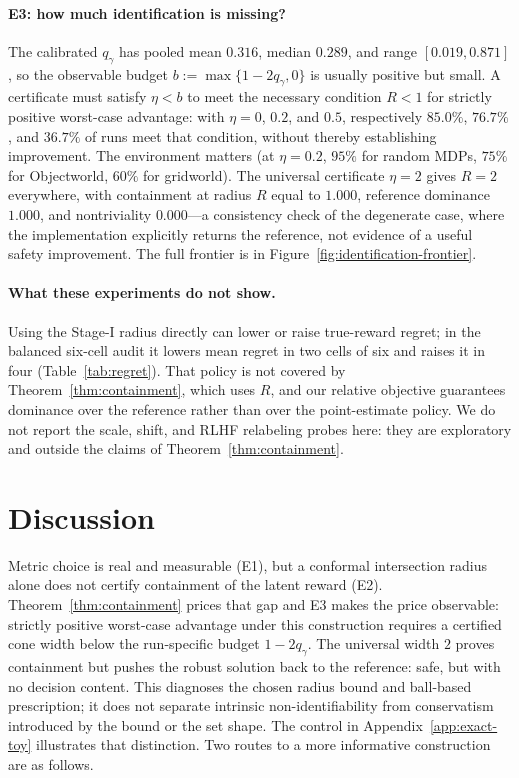 \documentclass{article}
\begin{document}
\paragraph{E3: how much identification is missing?} The calibrated $q_\gamma$
has pooled mean $0.316$, median $0.289$, and range $[0.019,0.871]$, so the
observable budget $b:=\max\{1-2q_\gamma,0\}$ is usually positive but small. A
certificate must satisfy $\eta<b$ to meet the necessary condition $R<1$
for strictly positive worst-case advantage: with $\eta=0$, $0.2$, and $0.5$,
respectively $85.0\%$, $76.7\%$, and $36.7\%$ of runs meet that condition,
without thereby establishing improvement. The environment matters (at
$\eta=0.2$, $95\%$ for random MDPs, $75\%$ for Objectworld, $60\%$ for
gridworld). The universal certificate $\eta=2$ gives $R=2$ everywhere, with
containment at radius $R$ equal to $1.000$, reference dominance $1.000$, and nontriviality
$0.000$---a consistency check of the degenerate case, where the implementation
explicitly returns the reference, not evidence of a useful safety improvement. The full
frontier is
in Figure~\ref{fig:identification-frontier}.

\paragraph{What these experiments do not show.} Using the Stage-I radius
directly can lower or raise true-reward regret; in the balanced six-cell audit
it lowers mean regret in two cells of six and raises it in four
(Table~\ref{tab:regret}). That policy is not covered by
Theorem~\ref{thm:containment}, which uses $R$, and our relative objective
guarantees dominance over the reference rather than over the point-estimate
policy. We do not report the scale, shift, and RLHF relabeling probes here:
they are exploratory and outside the claims of Theorem~\ref{thm:containment}.

\section{Discussion}
\label{sec:discussion}

Metric choice is real and measurable (E1), but a conformal intersection radius
alone does not certify containment of the latent reward (E2).
Theorem~\ref{thm:containment} prices that gap and E3 makes the price
observable: strictly positive worst-case advantage under this construction
requires a certified cone width below the run-specific budget $1-2q_\gamma$.
The universal width $2$ proves containment
but pushes the robust solution back to the reference: safe, but with no
decision content. This diagnoses the chosen radius bound and ball-based
prescription; it does not separate intrinsic non-identifiability from
conservatism introduced by the bound or the set shape. The control in
Appendix~\ref{app:exact-toy} illustrates that distinction. Two routes to a
more informative construction are as follows.
\end{document}
